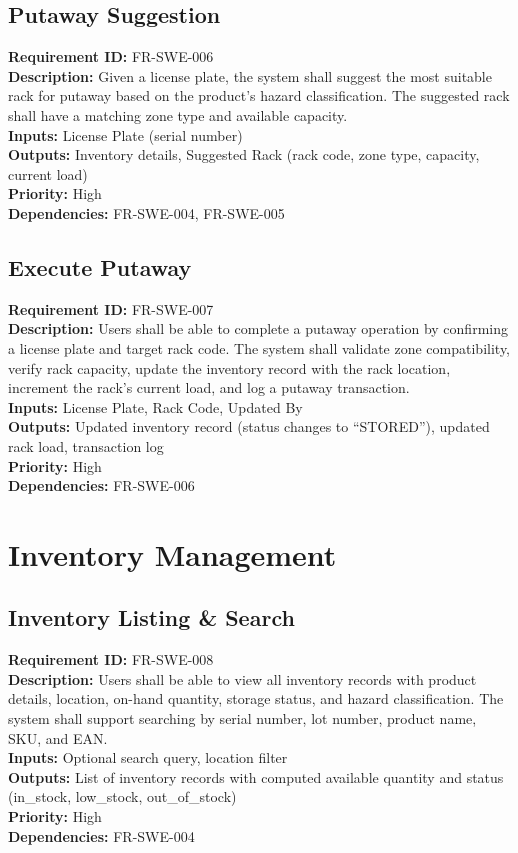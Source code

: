 \documentclass[12pt,a4paper]{report}
\begin{document}
\subsection{Putaway Suggestion}
\noindent\textbf{Requirement ID:} FR-SWE-006\\
\textbf{Description:} Given a license plate, the system shall suggest the most suitable rack for putaway based on the product's hazard classification. The suggested rack shall have a matching zone type and available capacity.\\
\textbf{Inputs:} License Plate (serial number)\\
\textbf{Outputs:} Inventory details, Suggested Rack (rack code, zone type, capacity, current load)\\
\textbf{Priority:} High\\
\textbf{Dependencies:} FR-SWE-004, FR-SWE-005

\subsection{Execute Putaway}
\noindent\textbf{Requirement ID:} FR-SWE-007\\
\textbf{Description:} Users shall be able to complete a putaway operation by confirming a license plate and target rack code. The system shall validate zone compatibility, verify rack capacity, update the inventory record with the rack location, increment the rack's current load, and log a putaway transaction.\\
\textbf{Inputs:} License Plate, Rack Code, Updated By\\
\textbf{Outputs:} Updated inventory record (status changes to ``STORED''), updated rack load, transaction log\\
\textbf{Priority:} High\\
\textbf{Dependencies:} FR-SWE-006

\section{Inventory Management}

\subsection{Inventory Listing \& Search}
\noindent\textbf{Requirement ID:} FR-SWE-008\\
\textbf{Description:} Users shall be able to view all inventory records with product details, location, on-hand quantity, storage status, and hazard classification. The system shall support searching by serial number, lot number, product name, SKU, and EAN.\\
\textbf{Inputs:} Optional search query, location filter\\
\textbf{Outputs:} List of inventory records with computed available quantity and status (in\_stock, low\_stock, out\_of\_stock)\\
\textbf{Priority:} High\\
\textbf{Dependencies:} FR-SWE-004
\end{document}
